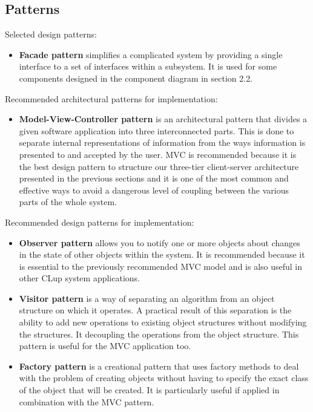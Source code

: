 \subsection{Patterns}
    Selected design patterns:
    \begin{itemize}
        \item \textbf{Facade pattern} simplifies a complicated system by providing a single interface to a set of interfaces within a subsystem. It is used for some components designed in the component diagram in section 2.2.
    \end{itemize}
    Recommended architectural patterns for implementation:
    \begin{itemize}
        \item \textbf{Model-View-Controller pattern} is an architectural pattern that divides a given software application into three interconnected parts. This is done to separate internal representations of information from the ways information is presented to and accepted by the user. MVC is recommended because it is the best design pattern to structure our three-tier client-server architecture presented in the previous sections and it is one of the most common and effective ways to avoid a dangerous level of coupling between the various parts of the whole system.
    \end{itemize}
    Recommended design patterns for implementation:
    \begin{itemize}
        \item \textbf{Observer pattern} allows you to notify one or more objects about changes in the state of other objects within the system. It is recommended because it is essential to the previously recommended MVC model and is also useful in other CLup system applications.
        \item \textbf{Visitor pattern} is a way of separating an algorithm from an object structure on which it operates. A practical result of this separation is the ability to add new operations to existing object structures without modifying the structures. It decoupling the operations from the object structure. This pattern is useful for the MVC application too.
        \item \textbf{Factory pattern} is a creational pattern that uses factory methods to deal with the problem of creating objects without having to specify the exact class of the object that will be created. It is particularly useful if applied in combination with the MVC pattern.
    \end{itemize}
